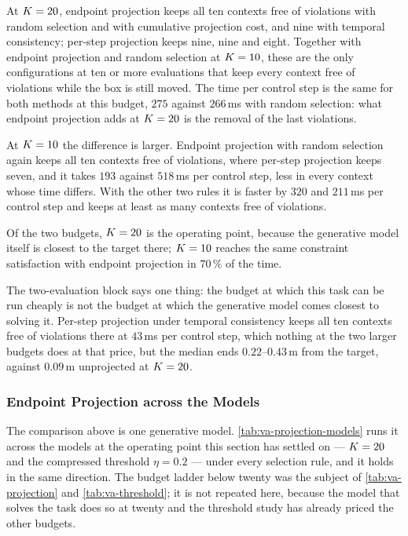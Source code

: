 At $K=20$, endpoint projection keeps all ten contexts free of violations with random selection and
with cumulative projection cost, and nine with temporal consistency; per-step projection keeps nine, nine
and eight. Together with endpoint projection and random selection at $K=10$, these are the only
configurations at ten or more evaluations that keep every context free of violations while the box is
still moved.
The time per control step is the same for both methods at this budget, $275$ against $266$\,ms with random
selection: what endpoint projection adds at $K=20$ is the removal of the last violations.

At $K=10$ the difference is larger. Endpoint projection with random selection again keeps all ten
contexts free of violations, where per-step projection keeps seven, and it takes $193$ against $518$\,ms
per control step, less in every context whose time differs. With the other two rules it is faster by
$320$ and $211$\,ms per control step and keeps at least as many contexts free of violations.

Of the two budgets, $K=20$ is the operating point, because the generative model itself is closest to
the target there; $K=10$ reaches the same constraint satisfaction with endpoint projection in
$70\,\%$ of the time.

The two-evaluation block says one thing: the budget at which this task can be run cheaply is not the
budget at which the generative model comes closest to solving it. Per-step projection under temporal consistency keeps all
ten contexts free of violations there at $43$\,ms per control step, which nothing at the two larger
budgets does at that price, but the median ends $0.22$--$0.43$\,m from the target, against $0.09$\,m
unprojected at $K=20$.

\subsubsection{Endpoint Projection across the Models}\label{sec:res:aligning:projection:models}

The comparison above is one generative model. \autoref{tab:va-projection-models} runs it across the
models at the operating point this section has settled on --- $K=20$ and the compressed threshold
$\eta=0.2$ --- under every selection rule, and it holds in the same direction. The budget ladder below
twenty was the subject of \autoref{tab:va-projection} and \autoref{tab:va-threshold}; it is not repeated
here, because the model that solves the task does so at twenty and the threshold study has already priced
the other budgets.

